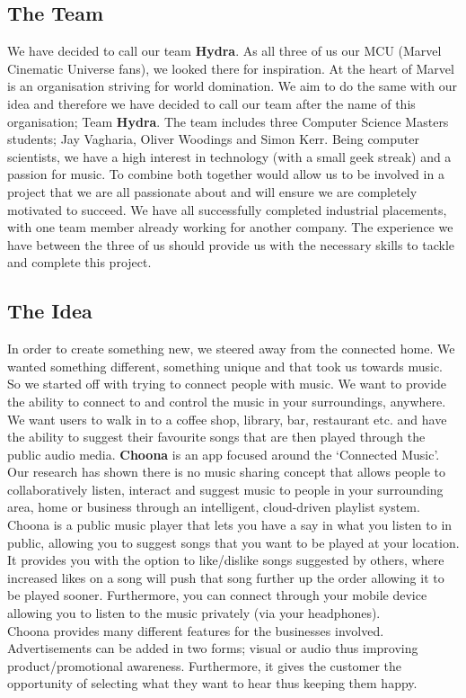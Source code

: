 \subsection{The Team}
We have decided to call our team \textbf{Hydra}.  As all three of us our MCU (Marvel Cinematic Universe fans), we looked there for inspiration.  At the heart of Marvel is an organisation striving for world domination.  We aim to do the same with our idea and therefore we have decided to call our team after the name of this organisation; Team \textbf{Hydra}.  The team includes three Computer Science Masters students; Jay Vagharia, Oliver Woodings and Simon Kerr.  Being computer scientists, we have a high interest in technology (with a small geek streak) and a passion for music.  To combine both together would allow us to be involved in a project that we are all passionate about and will ensure we are completely motivated to succeed.  We have all successfully completed industrial placements, with one team member already working for another company.  The experience we have between the three of us should provide us with the necessary skills to tackle and complete this project. 

\subsection{The Idea}
In order to create something new, we steered away from the connected home.  We wanted something different, something unique and that took us towards music.  So we started off with trying to connect people with music.  We want to provide the ability to connect to and control the music in your surroundings, anywhere.  We want users to walk in to a coffee shop, library, bar, restaurant etc. and have the ability to suggest their favourite songs that are then played through the public audio media.  \textbf{Choona} is an app focused around the `Connected Music'.  Our research has shown there is no music sharing concept that allows people to collaboratively listen, interact and suggest music to people in your surrounding area, home or business through an intelligent, cloud-driven playlist system.  \\
Choona is a public music player that lets you have a say in what you listen to in public, allowing you to suggest songs that you want to be played at your location.  It provides you with the option to like/dislike songs suggested by others, where increased likes on a song will push that song further up the order allowing it to be played sooner.  Furthermore, you can connect through your mobile device allowing you to listen to the music privately (via your headphones).  \\
Choona provides many different features for the businesses involved.  Advertisements can be added in two forms; visual or audio thus improving product/promotional awareness.  Furthermore, it gives the  customer the opportunity of selecting what they want to hear thus keeping them happy.  